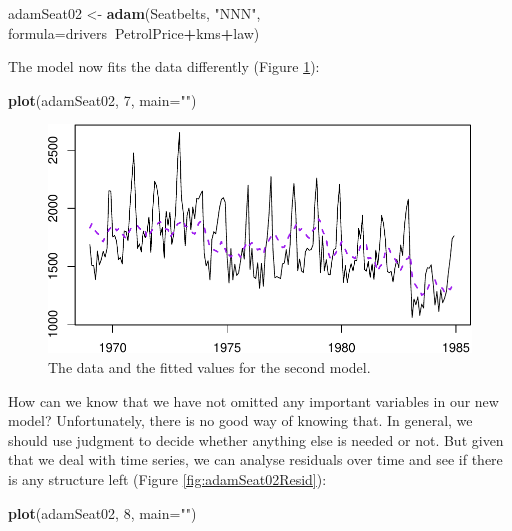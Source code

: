 \documentclass[]{book}
\newenvironment{Shaded}{\begin{snugshade}}{\end{snugshade}}
\newcommand{\DataTypeTok}[1]{\textcolor[rgb]{0.13,0.29,0.53}{#1}}
\newcommand{\DecValTok}[1]{\textcolor[rgb]{0.00,0.00,0.81}{#1}}
\newcommand{\KeywordTok}[1]{\textcolor[rgb]{0.13,0.29,0.53}{\textbf{#1}}}
\newcommand{\NormalTok}[1]{#1}
\newcommand{\OperatorTok}[1]{\textcolor[rgb]{0.81,0.36,0.00}{\textbf{#1}}}
\newcommand{\StringTok}[1]{\textcolor[rgb]{0.31,0.60,0.02}{#1}}
\theoremstyle{definition}
\theoremstyle{definition}
\theoremstyle{definition}
\theoremstyle{definition}
\theoremstyle{remark}
\begin{document}
\begin{Shaded}
\begin{Highlighting}[]
\NormalTok{adamSeat02 <-}\StringTok{ }\KeywordTok{adam}\NormalTok{(Seatbelts, }\StringTok{"NNN"}\NormalTok{,}
                   \DataTypeTok{formula=}\NormalTok{drivers}\OperatorTok{~}\NormalTok{PetrolPrice}\OperatorTok{+}\NormalTok{kms}\OperatorTok{+}\NormalTok{law)}
\end{Highlighting}
\end{Shaded}

The model now fits the data differently (Figure \ref{fig:adamSeat02}):

\begin{Shaded}
\begin{Highlighting}[]
\KeywordTok{plot}\NormalTok{(adamSeat02, }\DecValTok{7}\NormalTok{, }\DataTypeTok{main=}\StringTok{""}\NormalTok{)}
\end{Highlighting}
\end{Shaded}

\begin{figure}
\centering
\includegraphics{Svetunkov--2022----ADAM_files/figure-latex/adamSeat02-1.pdf}
\caption{\label{fig:adamSeat02}The data and the fitted values for the second model.}
\end{figure}

How can we know that we have not omitted any important variables in our new model? Unfortunately, there is no good way of knowing that. In general, we should use judgment to decide whether anything else is needed or not. But given that we deal with time series, we can analyse residuals over time and see if there is any structure left (Figure \ref{fig:adamSeat02Resid}):

\begin{Shaded}
\begin{Highlighting}[]
\KeywordTok{plot}\NormalTok{(adamSeat02, }\DecValTok{8}\NormalTok{, }\DataTypeTok{main=}\StringTok{""}\NormalTok{)}
\end{Highlighting}
\end{Shaded}
\end{document}
